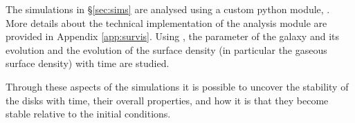 The simulations in \S\ref{sec:sims} are analysed using a custom python module, \sv. 
More details about the technical implementation of the analysis module are provided in Appendix \ref{app:survis}.
Using \sv, the \citet{toomre_gravitational_1964} parameter of the galaxy and its evolution and the evolution of the surface density (in particular the gaseous surface density) with time are studied.

Through these aspects of the simulations it is possible to uncover the stability of the disks with time, their overall properties, and how it is that they become stable relative to the initial conditions.
